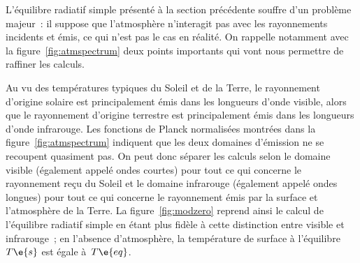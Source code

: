\sk
L'équilibre radiatif simple présenté à la section précédente souffre d'un problème majeur~: il suppose que l'atmosphère n'interagit pas avec les rayonnements incidents et émis, ce qui n'est pas le cas en réalité. On rappelle notamment avec la figure~\ref{fig:atmspectrum} deux points importants qui vont nous permettre de raffiner les calculs.
\begin{finger}
\item Au vu des températures typiques du Soleil et de la Terre, le rayonnement d'origine solaire est principalement émis dans les longueurs d'onde visible, alors que le rayonnement d'origine terrestre est principalement émis dans les longueurs d'onde infrarouge. Les fonctions de Planck normalisées montrées dans la figure~\ref{fig:atmspectrum} indiquent que les deux domaines d'émission ne se recoupent quasiment pas. On peut donc séparer les calculs selon le domaine visible (également appelé ondes courtes) pour tout ce qui concerne le rayonnement reçu du Soleil et le domaine infrarouge (également appelé ondes longues) pour tout ce qui concerne le rayonnement émis par la surface et l'atmosphère de la Terre. La figure~\ref{fig:modzero} reprend ainsi le calcul de l'équilibre radiatif simple en étant plus fidèle à cette distinction entre visible et infrarouge~; en l'absence d'atmosphère, la température de surface à l'équilibre~$T\e{s}$ est égale à~$T\e{eq}$.

\end{finger}
